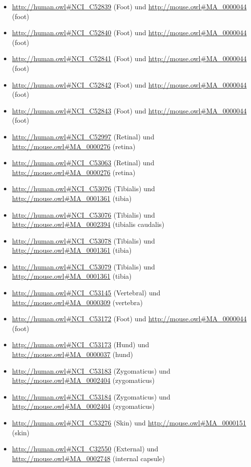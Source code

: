 \begin{itemize}
	\item \url{http://human.owl#NCI_C52839} (Foot\textunderscoreDigit{}) und \url{http://mouse.owl#MA_0000044} (foot)
	\item \url{http://human.owl#NCI_C52840} (Foot\textunderscoreDigit{}) und \url{http://mouse.owl#MA_0000044} (foot)
	\item \url{http://human.owl#NCI_C52841} (Foot\textunderscoreDigit{}) und \url{http://mouse.owl#MA_0000044} (foot)
	\item \url{http://human.owl#NCI_C52842} (Foot\textunderscoreDigit{}) und \url{http://mouse.owl#MA_0000044} (foot)
	\item \url{http://human.owl#NCI_C52843} (Foot\textunderscoreDigit{}) und \url{http://mouse.owl#MA_0000044} (foot)
	\item \url{http://human.owl#NCI_C52997} (Retinal\textunderscoreArtery) und \url{http://mouse.owl#MA_0000276} (retina)
	\item \url{http://human.owl#NCI_C53063} (Retinal\textunderscoreVein) und \url{http://mouse.owl#MA_0000276} (retina)
	\item \url{http://human.owl#NCI_C53076} (Tibialis) und \url{http://mouse.owl#MA_0001361} (tibia)
	\item \url{http://human.owl#NCI_C53076} (Tibialis) und \url{http://mouse.owl#MA_0002394} (tibialis caudalis)
	\item \url{http://human.owl#NCI_C53078} (Tibialis\textunderscoreCaudalis) und \url{http://mouse.owl#MA_0001361} (tibia)
	\item \url{http://human.owl#NCI_C53079} (Tibialis\textunderscoreCranialis) und \url{http://mouse.owl#MA_0001361} (tibia)
	\item \url{http://human.owl#NCI_C53145} (Vertebral\textunderscoreVein) und \url{http://mouse.owl#MA_0000309} (vertebra)
	\item \url{http://human.owl#NCI_C53172} (Foot\textunderscoreInterosseous\textunderscoreMuscle) und \url{http://mouse.owl#MA_0000044} (foot)
	\item \url{http://human.owl#NCI_C53173} (Hund\textunderscoreInterosseous\textunderscoreMuscle) und \url{http://mouse.owl#MA_0000037} (hund)
	\item \url{http://human.owl#NCI_C53183} (Zygomaticus\textunderscoreMajor) und \url{http://mouse.owl#MA_0002404} (zygomaticus)
	\item \url{http://human.owl#NCI_C53184} (Zygomaticus\textunderscoreMinor) und \url{http://mouse.owl#MA_0002404} (zygomaticus)
	\item \url{http://human.owl#NCI_C53276} (Skin\textunderscoreof\textunderscorethe\textunderscoreExtremity) und \url{http://mouse.owl#MA_0000151} (skin)
	\item \url{http://human.owl#NCI_C32550} (External\textunderscoreCapsule) und \url{http://mouse.owl#MA_0002748} (internal capsule)
\end{itemize}
